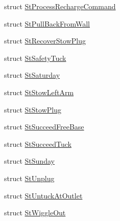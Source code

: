 \begin{DoxyCompactItemize}
\item 
struct \hyperlink{structsm__pr2__plugs_1_1StProcessRechargeCommand}{St\+Process\+Recharge\+Command}
\item 
struct \hyperlink{structsm__pr2__plugs_1_1StPullBackFromWall}{St\+Pull\+Back\+From\+Wall}
\item 
struct \hyperlink{structsm__pr2__plugs_1_1StRecoverStowPlug}{St\+Recover\+Stow\+Plug}
\item 
struct \hyperlink{structsm__pr2__plugs_1_1StSafetyTuck}{St\+Safety\+Tuck}
\item 
struct \hyperlink{structsm__pr2__plugs_1_1StSaturday}{St\+Saturday}
\item 
struct \hyperlink{structsm__pr2__plugs_1_1StStowLeftArm}{St\+Stow\+Left\+Arm}
\item 
struct \hyperlink{structsm__pr2__plugs_1_1StStowPlug}{St\+Stow\+Plug}
\item 
struct \hyperlink{structsm__pr2__plugs_1_1StSucceedFreeBase}{St\+Succeed\+Free\+Base}
\item 
struct \hyperlink{structsm__pr2__plugs_1_1StSucceedTuck}{St\+Succeed\+Tuck}
\item 
struct \hyperlink{structsm__pr2__plugs_1_1StSunday}{St\+Sunday}
\item 
struct \hyperlink{structsm__pr2__plugs_1_1StUnplug}{St\+Unplug}
\item 
struct \hyperlink{structsm__pr2__plugs_1_1StUntuckAtOutlet}{St\+Untuck\+At\+Outlet}
\item 
struct \hyperlink{structsm__pr2__plugs_1_1StWiggleOut}{St\+Wiggle\+Out}
\end{DoxyCompactItemize}
